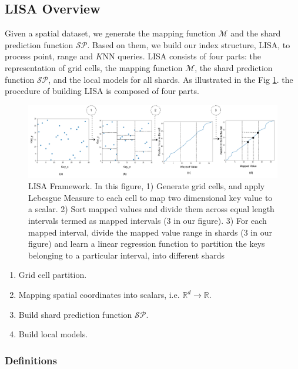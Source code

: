 \subsection{LISA Overview}

Given a spatial dataset, we generate the mapping function $\mathcal{M}$ and the shard prediction function $\mathcal{SP}$. Based on them, we build our index structure, LISA, to process point, range and $K$NN queries. LISA consists of four parts: the representation of grid cells, the mapping function $\mathcal{M}$, the shard prediction function $\mathcal{SP}$, and the local models for all shards. As illustrated in the Fig \ref{fig:LISA_Framework}. the procedure of building LISA is composed of four parts.

\begin{figure}[t]
    \centering
	\includegraphics[width=1\textwidth]{graphs/implementation/lisa_overview.pdf}
    \caption{LISA Framework. In this figure, 1) Generate grid cells, and apply Lebesgue Measure to each cell to map two dimensional key value to a scalar. 2) Sort mapped values and divide them across equal length intervals termed as mapped intervals (3 in our figure). 3) For each mapped interval, divide the mapped value range in shards  (3 in our figure) and learn a linear regression function to partition the keys belonging to a particular interval, into different shards }
    \label{fig:LISA_Framework}
\end{figure}

\begin{enumerate}
	\item Grid cell partition.
	\item Mapping spatial coordinates into scalars, i.e. $\mathbb{R}^d\to\mathbb{R}$.
	\item Build shard prediction function $\mathcal{SP}$.
	\item Build local models.
\end{enumerate}

\subsubsection{Definitions}

